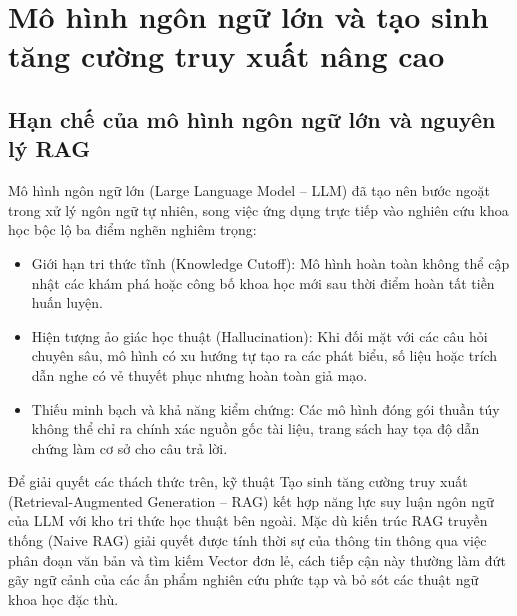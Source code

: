 \section{Mô hình ngôn ngữ lớn và tạo sinh tăng cường truy xuất nâng cao}
\label{sec:advanced_rag}

\subsection{Hạn chế của mô hình ngôn ngữ lớn và nguyên lý RAG}
\label{subsec:rag_foundation}
Mô hình ngôn ngữ lớn (Large Language Model -- LLM) đã tạo nên bước ngoặt trong xử lý ngôn ngữ tự nhiên, song việc ứng dụng trực tiếp vào nghiên cứu khoa học bộc lộ ba điểm nghẽn nghiêm trọng:
\begin{itemize}
    \item Giới hạn tri thức tĩnh (Knowledge Cutoff): Mô hình hoàn toàn không thể cập nhật các khám phá hoặc công bố khoa học mới sau thời điểm hoàn tất tiền huấn luyện.
    \item Hiện tượng ảo giác học thuật (Hallucination): Khi đối mặt với các câu hỏi chuyên sâu, mô hình có xu hướng tự tạo ra các phát biểu, số liệu hoặc trích dẫn nghe có vẻ thuyết phục nhưng hoàn toàn giả mạo.
    \item Thiếu minh bạch và khả năng kiểm chứng: Các mô hình đóng gói thuần túy không thể chỉ ra chính xác nguồn gốc tài liệu, trang sách hay tọa độ dẫn chứng làm cơ sở cho câu trả lời.
\end{itemize}

Để giải quyết các thách thức trên, kỹ thuật Tạo sinh tăng cường truy xuất (Retrieval-Augmented Generation -- RAG) kết hợp năng lực suy luận ngôn ngữ của LLM với kho tri thức học thuật bên ngoài. Mặc dù kiến trúc RAG truyền thống (Naive RAG) giải quyết được tính thời sự của thông tin thông qua việc phân đoạn văn bản và tìm kiếm Vector đơn lẻ, cách tiếp cận này thường làm đứt gãy ngữ cảnh của các ấn phẩm nghiên cứu phức tạp và bỏ sót các thuật ngữ khoa học đặc thù.

